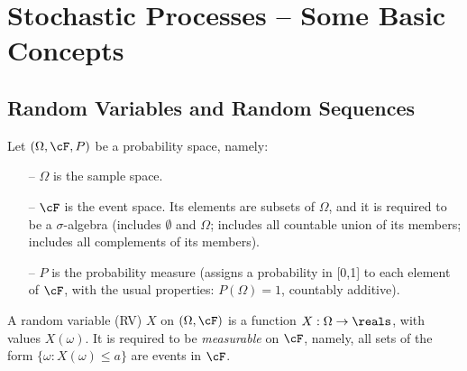 %
%
%
%
%
%
%
%
%

\newcommand{\midarrow}{\to}
\newcommand{\uu}{\underline}
\newcommand{\oo}{\overline}
\newcommand{\limn}{\lim_{n \to \infty}}
\newcommand{\limsupn}{\limsup_{n \to \infty}}

\section{Stochastic Processes -- Some Basic Concepts}

\subsection{Random Variables and Random Sequences}

Let $(\Omega,\cF,P)$ be a probability space, namely:
\begin{itemize}
\item[--] $\Omega$ is the sample space.
\item[--] $\cF$ is the event space. Its elements are subsets
of $\Omega$, and it is required to be a $\sigma$-algebra
(includes $\emptyset$ and $\Omega$; includes all countable union of its members;
includes all complements of its members).
\item[--]$P$ is the probability measure (assigns a probability in [0,1] to each element
of $\cF$, with the usual properties: $P(\Omega)=1$, countably additive).
\end{itemize}

A random variable (RV) $X$ on $(\Omega,\cF)$
is a function $X:\Omega \to \reals$, with values $X(\omega)$.
It is required to be {\em measurable} on $\cF$,
namely, all sets of the form $\{\omega: X(\omega)\le a\}$ are
events in $\cF$.

